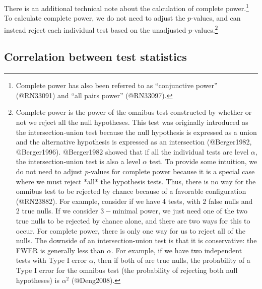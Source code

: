 \documentclass[
]{article}
\begin{document}
There is an additional technical note about the calculation of complete
power.\footnote{Complete power has also been referred to as “conjunctive power” (@RN33091) and “all pairs power” (@RN33097).}
To calculate complete power, we do not need to adjust the \(p\)-values,
and can instead reject each individual test based on the unadjusted
\(p\)-values.\footnote{
Complete power is the power of the omnibus test constructed by whether or not we reject all the null hypotheses.
This test was originally introduced as the intersection-union test because the null hypothesis is expressed as a union and the alternative hypothesis is expressed as an intersection (@Berger1982, @Berger1996).
@Berger1982 showed that if all the individual tests are level $\alpha$, the intersection-union test is also a level $\alpha$ test.
To provide some intuition, we do not need to adjust $p$-values for complete power because it is a special case where  we must reject *all* the hypothesis tests.
Thus, there is no way for the omnibus test to be rejected by chance because of a favorable configuration (@RN23882). 
For example, consider if we have 4 tests, with 2 false nulls and 2 true nulls.
If we consider $3-$minimal power, we just need one of the two true nulls to be rejected by chance alone, and there are two ways for this to occur.
For complete power, there is only one way for us to reject all of the nulls.
The downside of an intersection-union test is that it is conservative: the FWER is generally less than $\alpha$. 
For example, if we have two independent tests with Type I error $\alpha$, then if both of are true nulls, the probability of a Type I error for the omnibus test (the probability of rejecting both null hypotheses) is $\alpha^2$ (@Deng2008).}

\subsection{Correlation between test statistics}
\label{sec:corr}
\end{document}
